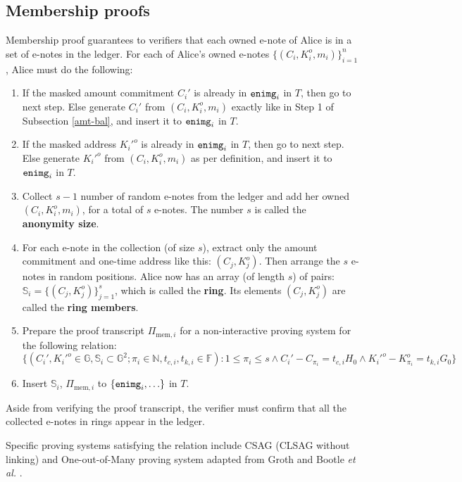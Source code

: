 \documentclass{article}
\theoremstyle{plain}
\theoremstyle{remark}
\begin{document}
\subsection{Membership proofs}\label{mem}
Membership proof guarantees to verifiers that each owned e-note of Alice is in a set of e-notes in the ledger. For each of Alice's owned e-notes $\{(C_i,K_i^o,m_i)\}_{i=1}^n$, Alice must do the following:
\begin{enumerate}
    \item If the masked amount commitment $C_i'$ is already in ${\tt enimg}_i$ in $T$, then go to next step. Else generate $C_i'$ from $(C_i, K_i^o, m_i)$ exactly like in Step 1 of Subsection \ref{amt-bal}, and insert it to ${\tt enimg}_i$ in $T$.
    \item If the masked address $K_i'^o$ is already in ${\tt enimg}_i$ in $T$, then go to next step. Else generate $K_i'^o$ from $(C_i, K_i^o, m_i)$ as per definition, and insert it to ${\tt enimg}_i$ in $T$.
    \item Collect $s-1$ number of random e-notes from the ledger and add her owned $(C_i,K_i^o,m_i)$, for a total of $s$ e-notes. The number $s$ is called the \textbf{anonymity size}.
    \item For each e-note in the collection (of size $s$), extract only the amount commitment and one-time address like this: $(C_j, K_j^o)$. Then arrange the $s$ e-notes in random positions. Alice now has an array (of length $s$) of pairs: $\mathbb{S}_i = \{(C_j, K_j^o)\}_{j=1}^s$, which is called the \textbf{ring}. Its elements $(C_j, K_j^o)$ are called the \textbf{ring members}. 
    \item Prepare the proof transcript $\Pi_{\text{mem}, i}$ for a non-interactive proving system for the following relation:
$$\{(C_i', K_i'^o \in\mathbb{G}, \mathbb{S}_i\subset\mathbb{G}^2; \pi_i\in\mathbb{N}, t_{c,i}, t_{k,i}\in\mathbb{F}): 1\le\pi_i\le s \wedge C_i' - C_{\pi_i} = t_{c,i} H_0 \wedge K_i'^o - K_{\pi_i}^o = t_{k,i} G_0 \}$$
    \item Insert $\mathbb{S}_i$, $\Pi_{\text{mem}, i}$ to $\{{\tt enimg}_i, \ldots\}$ in $T$.
\end{enumerate}
Aside from verifying the proof transcript, the verifier must confirm that all the collected e-notes in rings appear in the ledger.

Specific proving systems satisfying the relation include CSAG (CLSAG \cite{clsag} without linking) and One-out-of-Many proving system adapted from Groth and Bootle \textit{et al.} \cite{groth, bootle}.
\end{document}

